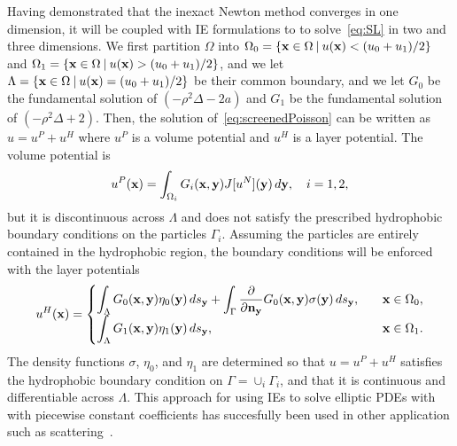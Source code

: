%   
Having demonstrated that the inexact Newton method converges in one
dimension, it will be coupled with IE formulations to to
solve~\eqref{eq:SL} in two and three dimensions. We first partition
$\Omega$ into $\Omega_0 = \{\mathbf{x} \in \Omega \:|\: u(\mathbf{x}) < (u_0 +
u_1)/2\}$ and $\Omega_1 = \{\mathbf{x} \in \Omega \:|\: u(\mathbf{x}) > (u_0 +
u_1)/2\}$, and we let $\Lambda = \{\mathbf{x} \in \Omega \:|\: u(\mathbf{x}) = (u_0 +
u_1)/2 \}$ be their common boundary, and we let $G_0$ be the fundamental
solution of $(-\rho^2 \Delta - 2a)$ and $G_1$ be the fundamental
solution of $(-\rho^2 \Delta + 2)$. Then, the solution
of~\eqref{eq:screenedPoisson} can be written as $u = u^P + u^H$ where
$u^P$ is a volume potential and $u^H$ is a layer potential. The volume
potential is
\begin{align*}
  u^{P}(\mathbf{x}) = \int_{\Omega_i} G_i(\mathbf{x},\mathbf{y}) J[u^N](\mathbf{y})\, d\mathbf{y}, 
    \quad i = 1,2,
\end{align*}
but it is discontinuous across $\Lambda$ and does not satisfy the
prescribed hydrophobic boundary conditions on the particles $\Gamma_i$.
Assuming the particles are entirely contained in the hydrophobic region,
the boundary conditions will be enforced with the layer potentials
\begin{align*}
  u^{H}(\mathbf{x}) = \begin{cases}
    \displaystyle\int_{\Lambda} G_0(\mathbf{x},\mathbf{y}) \eta_0(\mathbf{y}) \, ds_{\mathbf{y}} + 
    \displaystyle\int_{\Gamma} \frac{\partial }{\partial \mathbf{n}_{\mathbf{y}}} G_0(\mathbf{x},\mathbf{y})
      \sigma(\mathbf{y}) \,ds_{\mathbf{y}}, \quad & \mathbf{x} \in \Omega_0, \\
    \displaystyle\int_{\Lambda} G_1(\mathbf{x},\mathbf{y}) \eta_1(\mathbf{y}) \, ds_{\mathbf{y}},
     & \mathbf{x} \in \Omega_1.
  \end{cases}
\end{align*}
The density functions $\sigma$, $\eta_0$, and $\eta_1$ are determined so
that $u = u^P + u^H$ satisfies the hydrophobic boundary condition on
$\Gamma = \cup_i \Gamma_i$, and that it is continuous and differentiable
across $\Lambda$. This approach for using IEs to solve elliptic PDEs
with with piecewise constant coefficients has succesfully been used in
other application such as scattering~\cite{hyu-bar2014,
che-cho-cai2018}.

